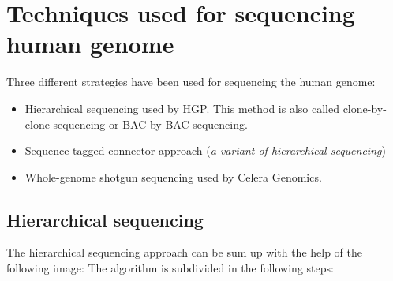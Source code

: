 \section{Techniques used for sequencing human genome}
Three different strategies have been used for sequencing the human genome:
\begin{itemize}
	\item Hierarchical sequencing used by HGP. This method is also called clone-by-clone sequencing or BAC-by-BAC sequencing.
	\item Sequence-tagged connector approach (\textit{a variant of hierarchical sequencing})
	\item Whole-genome shotgun sequencing used by Celera Genomics.
\end{itemize}

\subsection{Hierarchical sequencing}
The hierarchical sequencing approach can be sum up with the help of the following image:
The algorithm is subdivided in the following steps:
